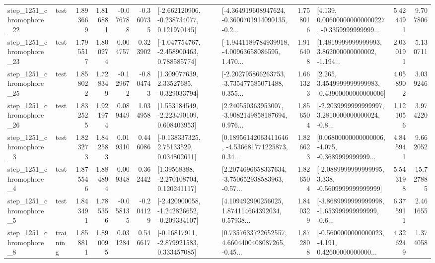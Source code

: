 \begin{tabular}{llrrrrllrlrr}
 step\_1251\_chromophore\_22 &      test &      1.893669 &    1.816881 &     -0.076788 & -0.360735 &   [-2.662120906, -0.238734077, 0.121970145] &  [-4.364919608947624, -0.3600701914090135, -0.2... &       1.758016 &  [4.139, 0.006000000000000227, -0.3359999999999... &            5.424491 &          9.707806 \\
 step\_1251\_chromophore\_23 &      test &      1.795517 &    1.800274 &      0.004757 &  0.323902 &   [-1.047754767, -2.458900463, 0.788585774] &  [-1.9441189784939918, -4.00963658086595, 1.470... &       1.916408 &  [1.4819999999999993, 3.862000000000002, -1.194... &            2.030191 &          5.130711 \\
 step\_1251\_chromophore\_25 &      test &      1.858022 &    1.728349 &     -0.129672 & -0.804743 &     [1.309077639, 2.33527685, -0.329033794] &  [-2.202795866263753, -3.735477585071488, 0.355... &       1.661323 &  [2.265, 3.4549999999999983, -0.43900000000000006] &            4.058902 &          3.039246 \\
 step\_1251\_chromophore\_26 &      test &      1.832525 &    1.921974 &      0.089449 &  1.034958 &    [1.553184549, -2.223490109, 0.608403953] &  [2.240550363953007, -3.9082149858187694, 0.976... &       1.856504 &  [-2.2039999999999997, 3.2810000000000024, -0.8... &            1.121056 &          3.974220 \\
  step\_1251\_chromophore\_3 &      test &      1.823273 &    1.842583 &      0.019310 &  0.446086 &     [-0.138337325, 2.75133529, 0.034802611] &  [0.18956142063411646, -4.536681771225873, 0.34... &       1.826623 &  [0.06800000000000006, -4.075, -0.3689999999999... &            4.845941 &          9.662052 \\
  step\_1251\_chromophore\_4 &      test &      1.875546 &    1.884894 &      0.009348 &  0.362442 &     [1.39568388, -2.270108704, 0.120241117] &  [2.2074696658337634, -3.750652938583963, -0.57... &       1.826504 &  [-2.0889999999999995, 3.338, -0.5609999999999999] &            5.543198 &         15.727885 \\
  step\_1251\_chromophore\_5 &      test &      1.843491 &    1.785356 &     -0.058135 & -0.204129 &  [-2.420900058, -1.242826652, -0.209334107] &  [4.109492990256025, 1.874114664392034, 0.57938... &       1.840329 &  [-3.8689999999999998, -1.653999999999999, -0.6... &            6.375911 &          2.461655 \\
  step\_1251\_chromophore\_8 &  training &      1.858811 &    1.890095 &      0.031284 &  0.546617 &    [-0.16817911, -2.879921583, 0.333457085] &  [0.7357633722652557, 4.6604400408087265, -0.45... &       1.872808 &  [-0.5600000000000023, -4.191, 0.42600000000000... &            4.326249 &          1.374058 \\

\end{tabular}

